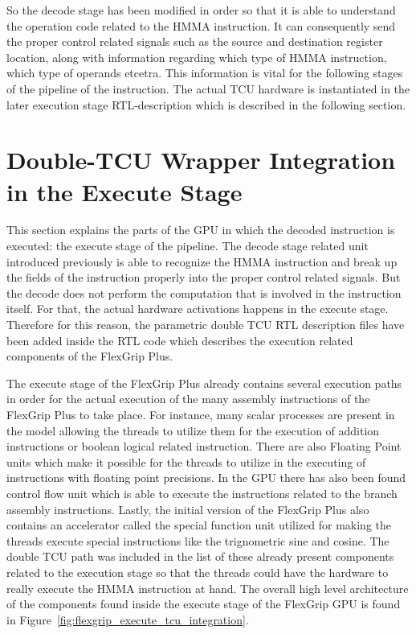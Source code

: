 
So the decode stage has been modified in order so that it is able to understand the operation code related to the HMMA instruction. It can consequently send the proper control related signals such as the source and destination register location, along with information regarding which type of HMMA instruction, which type of operands etcetra. This information is vital for the following stages of the pipeline of the instruction. The actual TCU hardware is instantiated in the later execution stage RTL-description which is described in the following section.

\section{Double-TCU Wrapper Integration in the Execute Stage}


This section explains the parts of the GPU in which the decoded instruction is executed: the execute stage of the pipeline. The decode stage related unit introduced previously is able to recognize the HMMA instruction and break up the fields of the instruction properly into the proper control related signals. But the decode does not perform the computation that is involved in the instruction itself. For that, the actual hardware activations happens in the execute stage. Therefore for this reason, the parametric double TCU RTL description files have been added inside the RTL code which describes the execution related components of the FlexGrip Plus. 


The execute stage of the FlexGrip Plus already contains several execution paths in order for the actual execution of the many assembly instructions of the FlexGrip Plus to take place. For instance, many scalar processes are present in the model allowing the threads to utilize them for the execution of addition instructions or boolean logical related instruction. There are also Floating Point units which make it possible for the threads to utilize in the executing of instructions with floating point precisions. In the GPU there has also been found control flow unit which is able to execute the instructions related to the branch assembly instructions. Lastly, the initial version of the FlexGrip Plus also contains an accelerator called the special function unit utilized for making the threads execute special instructions like the trignometric sine and cosine. The double TCU path was included in the list of these already present components related to the execution stage so that the threads could have the hardware to really execute the HMMA instruction at hand. The overall high level architecture of the components found inside the execute stage of the FlexGrip GPU is found in Figure~\ref{fig:flexgrip_execute_tcu_integration}. 

